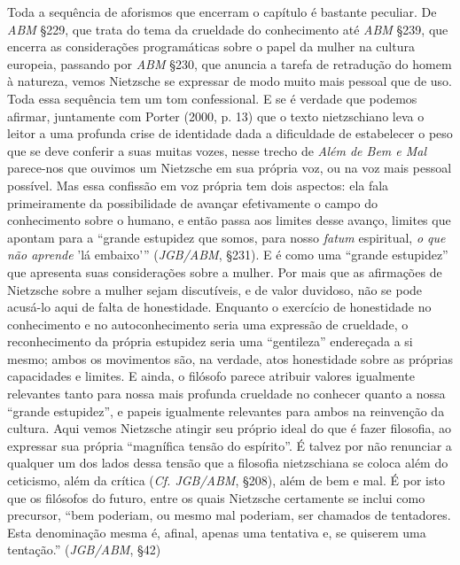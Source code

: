 \documentclass[
	12pt,				%
	openright,			%
	oneside,			%
	a4paper,			%
	english,			%
	french,				%
	spanish,			%
	brazil				%
	]{abntex2}
\begin{document}
	Toda a sequência de aforismos que encerram o capítulo é bastante peculiar. De \textit{ABM} §229, que trata do tema da crueldade do conhecimento até \textit{ABM} §239, que encerra as considerações programáticas sobre o papel da mulher na cultura europeia, passando por \textit{ABM} §230, que anuncia a tarefa de retradução do homem à natureza, vemos Nietzsche se expressar de modo muito mais pessoal que de uso. Toda essa sequência tem um tom confessional. E se é verdade que podemos afirmar, juntamente com  Porter (2000, p. 13) que o texto nietzschiano leva o leitor a uma profunda crise de identidade dada a dificuldade de estabelecer o peso que se deve conferir a suas muitas vozes, nesse trecho de \textit{Além de Bem e Mal} parece-nos que ouvimos um Nietzsche em sua própria voz, ou na voz mais pessoal possível. Mas essa confissão em voz própria tem dois aspectos: ela fala primeiramente da possibilidade de avançar efetivamente o campo do conhecimento sobre o humano, e então passa aos limites desse avanço, limites que apontam para a “grande estupidez que somos, para nosso \textit{fatum} espiritual, \textit{o que não aprende} 'lá embaixo'” (\textit{JGB/ABM}, §231). E é como uma “grande estupidez” que apresenta suas considerações sobre a mulher. Por mais que as afirmações de Nietzsche sobre a mulher sejam discutíveis, e de valor duvidoso, não se pode acusá-lo aqui de falta de honestidade. Enquanto o exercício de honestidade no conhecimento e no autoconhecimento seria uma expressão de crueldade, o reconhecimento da própria estupidez seria uma “gentileza” endereçada a si mesmo; ambos os movimentos são, na verdade, atos honestidade sobre as próprias capacidades e limites. E ainda, o filósofo parece atribuir valores igualmente relevantes tanto para nossa mais profunda crueldade no conhecer quanto a nossa “grande estupidez”, e papeis igualmente relevantes para ambos na reinvenção da cultura. Aqui vemos Nietzsche atingir seu próprio ideal do que é fazer filosofia, ao expressar sua própria “magnífica tensão do espírito”. É talvez por não renunciar a qualquer um dos lados dessa tensão que a filosofia nietzschiana se coloca além do ceticismo, além da crítica (\textit{Cf. JGB/ABM}, §208), além de bem e mal. É por isto que os filósofos do futuro, entre os quais Nietzsche certamente se inclui como precursor, “bem poderiam, ou mesmo mal poderiam, ser chamados de tentadores. Esta denominação mesma é, afinal, apenas uma tentativa e, se quiserem uma tentação.” (\textit{JGB/ABM}, §42)
\end{document}
